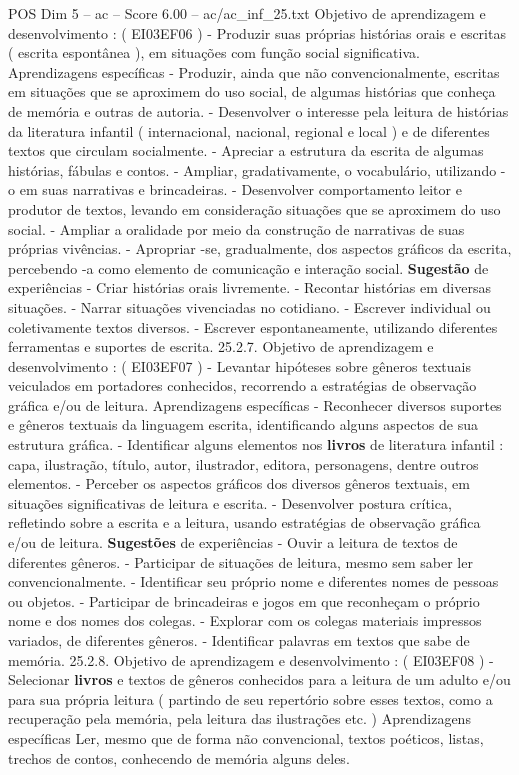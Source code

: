 \begin{textsample}{POS Dim 5 – ac – Score 6.00 – ac/ac\_inf\_25.txt}
Objetivo de aprendizagem e desenvolvimento : ( EI03EF06 ) - Produzir suas próprias histórias orais e escritas ( escrita espontânea ), em situações com função social significativa.
Aprendizagens específicas - Produzir, ainda que não convencionalmente, escritas em situações que se aproximem do uso social, de algumas histórias que conheça de memória e outras de autoria. - Desenvolver o interesse pela leitura de histórias da literatura infantil ( internacional, nacional, regional e local ) e de diferentes textos que circulam socialmente. - Apreciar a estrutura da escrita de algumas histórias, fábulas e contos. - Ampliar, gradativamente, o vocabulário, utilizando -o em suas narrativas e brincadeiras. - Desenvolver comportamento leitor e produtor de textos, levando em consideração situações que se aproximem do uso social. - Ampliar a oralidade por meio da construção de narrativas de suas próprias vivências. - Apropriar -se, gradualmente, dos aspectos gráficos da escrita, percebendo -a como elemento de comunicação e interação social. \textbf{Sugestão} de experiências - Criar histórias orais livremente. - Recontar histórias em diversas situações. - Narrar situações vivenciadas no cotidiano. - Escrever individual ou coletivamente textos diversos. - Escrever espontaneamente, utilizando diferentes ferramentas e suportes de escrita. 25.2.7.
Objetivo de aprendizagem e desenvolvimento : ( EI03EF07 ) - Levantar hipóteses sobre gêneros textuais veiculados em portadores conhecidos, recorrendo a estratégias de observação gráfica e/ou de leitura.
Aprendizagens específicas - Reconhecer diversos suportes e gêneros textuais da linguagem escrita, identificando alguns aspectos de sua estrutura gráfica. - Identificar alguns elementos nos \textbf{livros} de literatura infantil : capa, ilustração, título, autor, ilustrador, editora, personagens, dentre outros elementos. - Perceber os aspectos gráficos dos diversos gêneros textuais, em situações significativas de leitura e escrita. - Desenvolver postura crítica, refletindo sobre a escrita e a leitura, usando estratégias de observação gráfica e/ou de leitura. \textbf{Sugestões} de experiências - Ouvir a leitura de textos de diferentes gêneros. - Participar de situações de leitura, mesmo sem saber ler convencionalmente. - Identificar seu próprio nome e diferentes nomes de pessoas ou objetos. - Participar de brincadeiras e jogos em que reconheçam o próprio nome e dos nomes dos colegas. - Explorar com os colegas materiais impressos variados, de diferentes gêneros. - Identificar palavras em textos que sabe de memória. 25.2.8.
Objetivo de aprendizagem e desenvolvimento : ( EI03EF08 ) - Selecionar \textbf{livros} e textos de gêneros conhecidos para a leitura de um adulto e/ou para sua própria leitura ( partindo de seu repertório sobre esses textos, como a recuperação pela memória, pela leitura das ilustrações etc. ) Aprendizagens específicas Ler, mesmo que de forma não convencional, textos poéticos, listas, trechos de contos, conhecendo de memória alguns deles.

\end{textsample}
